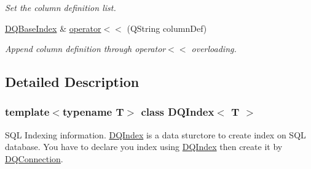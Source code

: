 \begin{DoxyCompactItemize}
\begin{DoxyCompactList}\small\item\em Set the column definition list. \item\end{DoxyCompactList}\item 
\hypertarget{classDQBaseIndex_a871bd9b3067dfdfd7f6a3762d3ccf986}{
\hyperlink{classDQBaseIndex}{DQBaseIndex} \& \hyperlink{classDQBaseIndex_a871bd9b3067dfdfd7f6a3762d3ccf986}{operator$<$$<$} (QString columnDef)}
\label{classDQBaseIndex_a871bd9b3067dfdfd7f6a3762d3ccf986}

\begin{DoxyCompactList}\small\item\em Append column definition through operator$<$$<$ overloading. \item\end{DoxyCompactList}\end{DoxyCompactItemize}


\subsection{Detailed Description}
\subsubsection*{template$<$typename T$>$ class DQIndex$<$ T $>$}

SQL Indexing information. \hyperlink{classDQIndex}{DQIndex} is a data sturctore to create index on SQL database. You have to declare you index using \hyperlink{classDQIndex}{DQIndex} then create it by \hyperlink{classDQConnection}{DQConnection}.


